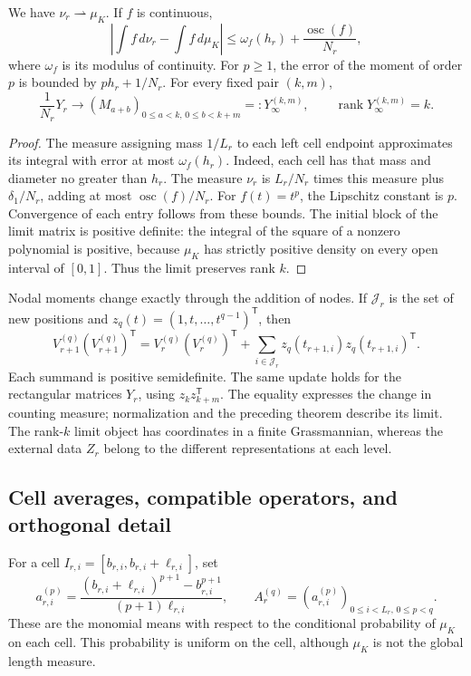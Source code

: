 \begin{theorem}
\label{thm:dim-nodal-limit}
We have \(\nu_r\rightharpoonup\mu_K\). If \(f\) is continuous,
\[
 \left|\int f\,d\nu_r-\int f\,d\mu_K\right|
 \leq \omega_f(h_r)+\frac{\operatorname{osc}(f)}{N_r},
\]
where \(\omega_f\) is its modulus of continuity. For \(p\geq1\),
the error of the moment of order \(p\) is bounded by
\(p h_r+1/N_r\). For every fixed pair \((k,m)\),
\[
 \frac1{N_r}Y_r\longrightarrow (M_{a+b})_{
     0\leq a<k,\,0\leq b<k+m}=:Y_\infty^{(k,m)},
 \qquad\operatorname{rank}Y_\infty^{(k,m)}=k.
\]
\end{theorem}
\begin{proof}
The measure assigning mass \(1/L_r\) to each left cell endpoint
approximates its integral with error at most \(\omega_f(h_r)\).
Indeed, each cell has that mass and diameter no greater than \(h_r\).
The measure \(\nu_r\) is \(L_r/N_r\) times this measure plus
\(\delta_1/N_r\), adding at most
\(\operatorname{osc}(f)/N_r\). For \(f(t)=t^p\), the Lipschitz
constant is \(p\). Convergence of each entry follows from these
bounds. The initial block of the limit matrix is positive definite:
the integral of the square of a nonzero polynomial is positive,
because \(\mu_K\) has strictly positive density on every open
interval of \([0,1]\). Thus the limit preserves rank \(k\).
\end{proof}

Nodal moments change exactly through the addition of nodes.
If \(\mathcal J_r\) is the set of new positions and
\(z_q(t)=(1,t,\ldots,t^{q-1})^{\mathsf T}\), then
\[
 V_{r+1}^{(q)}(V_{r+1}^{(q)})^{\mathsf T}
 =V_r^{(q)}(V_r^{(q)})^{\mathsf T}
  +\sum_{i\in\mathcal J_r}z_q(t_{r+1,i})z_q(t_{r+1,i})^{\mathsf T}.
\]
Each summand is positive semidefinite. The same update holds for the
rectangular matrices \(Y_r\), using \(z_kz_{k+m}^{\mathsf T}\).
The equality expresses the change in counting measure; normalization
and the preceding theorem describe its limit. The rank-\(k\) limit
object has coordinates in a finite Grassmannian, whereas the external
data \(Z_r\) belong to the different representations at each level.

\subsection{Cell averages, compatible operators, and orthogonal detail}

For a cell \(I_{r,i}=[b_{r,i},b_{r,i}+\ell_{r,i}]\), set
\[
 a_{r,i}^{(p)}=
 \frac{(b_{r,i}+\ell_{r,i})^{p+1}-b_{r,i}^{p+1}}
 {(p+1)\ell_{r,i}},\qquad
 A_r^{(q)}=(a_{r,i}^{(p)})_{0\leq i<L_r,\,0\leq p<q}.
\]
These are the monomial means with respect to the conditional probability
of \(\mu_K\) on each cell. This probability is uniform on the cell,
although \(\mu_K\) is not the global length measure.

